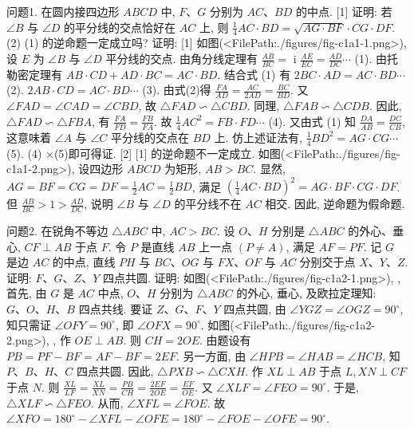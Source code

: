 
问题1. 在圆内接四边形 $A B C D$ 中, $F 、 G$ 分别为 $A C 、 B D$ 的中点.
[1] 证明: 若 $\angle B$ 与 $\angle D$ 的平分线的交点恰好在 $A C$ 上, 则 $\frac{1}{4} A C \cdot B D= \sqrt{A G \cdot B F} \cdot C G \cdot D F$. (2) (1) 的逆命题一定成立吗?
证明: [1] 如图(<FilePath:./figures/fig-c1a1-1.png>), 设 $E$ 为 $\angle B$ 与 $\angle D$ 平分线的交点.
由角分线定理有 $\frac{A B}{B C}=$ i $\frac{A E}{E C}=\frac{A D}{D C} \cdots$ (1). 由托勒密定理有 $A B \cdot C D+A D \cdot B C=A C \cdot B D$. 结合式 (1) 有 $2 B C \cdot A D=A C \cdot B D \cdots$ (2). $2 A B \cdot C D=A C \cdot B D \cdots$ (3).
由式(2)得 $\frac{F A}{A D}= \frac{A C}{2 A D}=\frac{B C}{B D}$. 又 $\angle F A D=\angle C A D=\angle C B D$, 故 $\triangle F A D \backsim \triangle C B D$. 同理, $\triangle F A B \backsim \triangle C D B$. 因此, $\triangle F A D \backsim \triangle F B A$, 有 $\frac{F A}{F D}=\frac{F B}{F A}$. 故 $\frac{1}{4} A C^2=F B \cdot F D \cdots$ (4). 
又由式 (1) 知 $\frac{D A}{A B}=\frac{D C}{C B}$, 这意味着 $\angle A$ 与 $\angle C$ 平分线的交点在 $B D$ 上.
仿上述证法有, $\frac{1}{4} B D^2=A G \cdot C G \cdots$ (5). (4) $\times$(5)即可得证.
[2] [1] 的逆命题不一定成立.
如图(<FilePath:./figures/fig-c1a1-2.png>), 设四边形 $A B C D$ 为矩形, $A B>B C$. 显然, $A G=B F=C G=D F= \frac{1}{2} A C=\frac{1}{2} B D$, 满足 $\left(\frac{1}{4} A C \cdot B D\right)^2=A G \cdot B F \cdot C G \cdot D F$. 但 $\frac{A B}{B C}>1>\frac{A D}{D C}$,
说明 $\angle B$ 与 $\angle D$ 的平分线不在 $A C$ 相交.
因此, 逆命题为假命题.



问题2. 在锐角不等边 $\triangle A B C$ 中, $A C>B C$. 设 $O 、 H$ 分别是 $\triangle A B C$ 的外心、垂心, $C F \perp A B$ 于点 $F$. 令 $P$ 是直线 $A B$ 上一点 $(P \neq A)$, 满足 $A F=P F$. 记 $G$ 是边 $A C$ 的中点, 直线 $P H$ 与 $B C 、 O G$ 与 $F X 、 O F$ 与 $A C$ 分别交于点 $X 、 Y 、 Z$. 证明: $F 、 G 、 Z 、 Y$ 四点共圆.
证明: 如图(<FilePath:./figures/fig-c1a2-1.png>), , 首先, 由 $G$ 是 $A C$ 中点, $O 、 H$ 分别为 $\triangle A B C$ 的外心, 垂心, 及欧拉定理知: $G 、 O 、 H 、 B$ 四点共线.
要证 $Z 、 G 、 F 、 Y$ 四点共圆, 由 $\angle Y G Z=\angle O G Z=90^{\circ}$, 知只需证 $\angle O F Y=90^{\circ}$, 即 $\angle O F X=90^{\circ}$.
如图(<FilePath:./figures/fig-c1a2-2.png>), , 作 $O E \perp A B$. 则 $C H=2 O E$. 由题设有 $P B=P F-B F=A F- B F=2 E F$. 另一方面, 由 $\angle H P B=\angle H A B=\angle H C B$, 知 $P 、 B 、 H 、 C$ 四点共圆.
因此, $\triangle P X B \backsim \triangle C X H$. 作 $X L \perp A B$ 于点 $L, X N \perp C F$ 于点 $N$. 则 $\frac{X L}{L F}= \frac{X L}{X N}=\frac{P B}{C H}=\frac{2 E F}{2 O E}=\frac{E F}{O E}$. 又 $\angle X L F=\angle F E O=90^{\circ}$. 于是, $\triangle X L F \backsim \triangle F E O$. 从而, $\angle X F L=\angle F O E$. 故 $\angle X F O=180^{\circ}-\angle X F L-\angle O F E= 180^{\circ}-\angle F O E-\angle O F E=90^{\circ}$.



